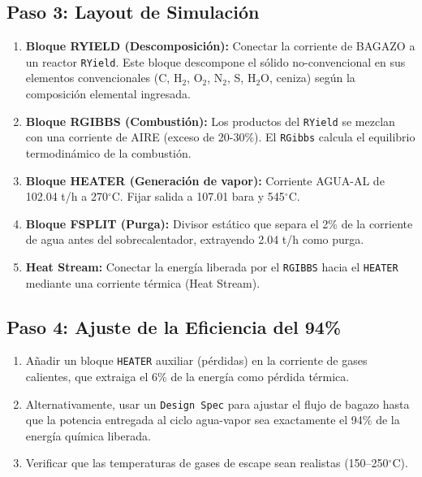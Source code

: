 \subsection{Paso 3: Layout de Simulación}
\begin{enumerate}
	\item \textbf{Bloque RYIELD (Descomposición):} Conectar la corriente de BAGAZO a un reactor \texttt{RYield}. Este bloque descompone el sólido no-convencional en sus elementos convencionales (C, H$_2$, O$_2$, N$_2$, S, H$_2$O, ceniza) según la composición elemental ingresada.
	\item \textbf{Bloque RGIBBS (Combustión):} Los productos del \texttt{RYield} se mezclan con una corriente de AIRE (exceso de 20-30\%). El \texttt{RGibbs} calcula el equilibrio termodinámico de la combustión.
	\item \textbf{Bloque HEATER (Generación de vapor):} Corriente AGUA-AL de 102.04 t/h a 270$^{\circ}$C. Fijar salida a 107.01 bara y 545$^{\circ}$C.
	\item \textbf{Bloque FSPLIT (Purga):} Divisor estático que separa el 2\% de la corriente de agua antes del sobrecalentador, extrayendo 2.04 t/h como purga.
	\item \textbf{Heat Stream:} Conectar la energía liberada por el \texttt{RGIBBS} hacia el \texttt{HEATER} mediante una corriente térmica (Heat Stream).
\end{enumerate}

\subsection{Paso 4: Ajuste de la Eficiencia del 94\%}
\begin{enumerate}
	\item Añadir un bloque \texttt{HEATER} auxiliar (pérdidas) en la corriente de gases calientes, que extraiga el 6\% de la energía como pérdida térmica.
	\item Alternativamente, usar un \texttt{Design Spec} para ajustar el flujo de bagazo hasta que la potencia entregada al ciclo agua-vapor sea exactamente el 94\% de la energía química liberada.
	\item Verificar que las temperaturas de gases de escape sean realistas (150--250$^{\circ}$C).
\end{enumerate}

